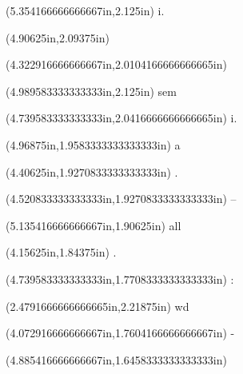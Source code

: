 \documentclass{article}
\begin{document}
\begin{textblock*}{8.0in}(5.354166666666667in,2.125in)
\fontsize{3.75}{4.50}\selectfont
i.
\end{textblock*}
\begin{textblock*}{8.0in}(4.90625in,2.09375in)
\fontsize{2.25}{2.70}
\end{textblock*}
\begin{textblock*}{8.0in}(4.322916666666667in,2.0104166666666665in)
\fontsize{1.50}{1.80}
\end{textblock*}
\begin{textblock*}{8.0in}(4.989583333333333in,2.125in)
\fontsize{10.50}{12.60}\selectfont
 sem
\end{textblock*}
\begin{textblock*}{8.0in}(4.739583333333333in,2.0416666666666665in)
\fontsize{6.00}{7.20}\selectfont
i.
\end{textblock*}
\begin{textblock*}{8.0in}(4.96875in,1.9583333333333333in)
\fontsize{0.75}{0.90}\selectfont
a
\end{textblock*}
\begin{textblock*}{8.0in}(4.40625in,1.9270833333333333in)
\fontsize{3.75}{4.50}\selectfont
.
\end{textblock*}
\begin{textblock*}{8.0in}(4.520833333333333in,1.9270833333333333in)
\fontsize{4.50}{5.40}\selectfont
--
\end{textblock*}
\begin{textblock*}{8.0in}(5.135416666666667in,1.90625in)
\fontsize{4.50}{5.40}\selectfont
all
\end{textblock*}
\begin{textblock*}{8.0in}(4.15625in,1.84375in)
\fontsize{4.50}{5.40}\selectfont
.
\end{textblock*}
\begin{textblock*}{8.0in}(4.739583333333333in,1.7708333333333333in)
\fontsize{3.00}{3.60}\selectfont
:
\end{textblock*}
\begin{textblock*}{8.0in}(2.4791666666666665in,2.21875in)
\fontsize{35.25}{42.30}\selectfont
wd
\end{textblock*}
\begin{textblock*}{8.0in}(4.072916666666667in,1.7604166666666667in)
\fontsize{6.00}{7.20}\selectfont
-
\end{textblock*}
\begin{textblock*}{8.0in}(4.885416666666667in,1.6458333333333333in)
\fontsize{1.50}{1.80}
\end{textblock*}
\end{document}
